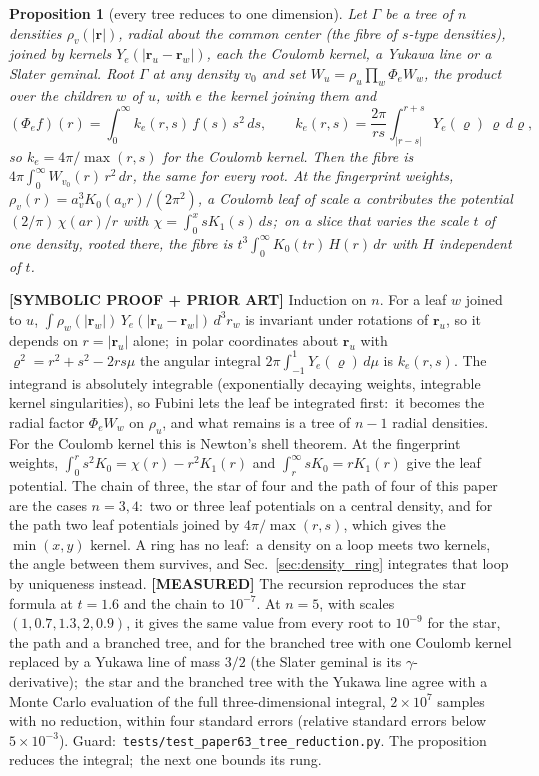 \documentclass[aps,pra,twocolumn,superscriptaddress,longbibliography]{revtex4-2}
\newtheorem{proposition}{Proposition}
\begin{document}
\begin{proposition}[every tree reduces to one dimension]
\label{prop:tree_reduction}
Let $\Gamma$ be a tree of $n$ densities $\rho_v(|\bm r|)$, radial about the
common center (the fibre of $s$-type densities), joined by kernels
$Y_e(|\bm r_u-\bm r_w|)$, each the Coulomb kernel, a Yukawa line or a
Slater geminal.  Root $\Gamma$ at any density $v_0$ and set
$W_u=\rho_u\prod_w\Phi_eW_w$, the product over the children $w$ of $u$,
with $e$ the kernel joining them and
\begin{equation}
  (\Phi_ef)(r)=\int_0^\infty k_e(r,s)\,f(s)\,s^2\,ds,\qquad
  k_e(r,s)=\frac{2\pi}{rs}\int_{|r-s|}^{r+s}Y_e(\varrho)\,\varrho\,d\varrho ,
  \label{eq:tree_reduction}
\end{equation}
so $k_e=4\pi/\max(r,s)$ for the Coulomb kernel.  Then the fibre is
$4\pi\int_0^\infty W_{v_0}(r)\,r^2\,dr$, the same for every root.  At the
fingerprint weights, $\rho_v(r)=a_v^3K_0(a_vr)/(2\pi^2)$, a Coulomb leaf of
scale $a$ contributes the potential $(2/\pi)\,\chi(ar)/r$ with
$\chi=\int_0^xsK_1(s)\,ds$;\ on a slice that varies the scale $t$ of one
density, rooted there, the fibre is $t^3\int_0^\infty K_0(tr)\,H(r)\,dr$
with $H$ independent of $t$.
\end{proposition}

\textbf{[SYMBOLIC PROOF + PRIOR ART]} Induction on $n$.  For a leaf $w$
joined to $u$, $\int\rho_w(|\bm r_w|)\,Y_e(|\bm r_u-\bm r_w|)\,d^3r_w$ is
invariant under rotations of $\bm r_u$, so it depends on $r=|\bm r_u|$
alone;\ in polar coordinates about $\bm r_u$ with $\varrho^2=r^2+s^2-2rs\mu$
the angular integral $2\pi\int_{-1}^{1}Y_e(\varrho)\,d\mu$ is $k_e(r,s)$.
The integrand is absolutely integrable (exponentially decaying weights,
integrable kernel singularities), so Fubini lets the leaf be integrated first:\
it becomes the radial factor $\Phi_eW_w$ on $\rho_u$, and what remains is a
tree of $n-1$ radial densities.  For the Coulomb kernel this is Newton's
shell theorem.  At the fingerprint weights,
$\int_0^rs^2K_0=\chi(r)-r^2K_1(r)$ and $\int_r^\infty sK_0=rK_1(r)$ give the
leaf potential.  The chain of three, the star of four and the path of four
of this paper are the cases $n=3,4$:\ two or three leaf potentials on a
central density, and for the path two leaf potentials joined by
$4\pi/\max(r,s)$, which gives the $\min(x,y)$ kernel.  A ring has no leaf:\
a density on a loop meets two kernels, the angle between them survives, and
Sec.~\ref{sec:density_ring} integrates that loop by uniqueness instead.
\textbf{[MEASURED]} The recursion reproduces the star formula at $t=1.6$
and the chain to $10^{-7}$.  At $n=5$, with scales $(1,0.7,1.3,2,0.9)$, it
gives the same value from every root to $10^{-9}$ for the star, the path and
a branched tree, and for the branched tree with one Coulomb kernel replaced
by a Yukawa line of mass $3/2$ (the Slater geminal is its
$\gamma$-derivative);\ the star and the branched tree with the Yukawa line
agree with a Monte Carlo evaluation of the full three-dimensional integral,
$2\times10^7$ samples with no reduction, within four standard errors (relative
standard errors below $5\times10^{-3}$).  Guard:\
\texttt{tests/test\_paper63\_tree\_reduction.py}.  The proposition reduces
the integral;\ the next one bounds its rung.
\end{document}
